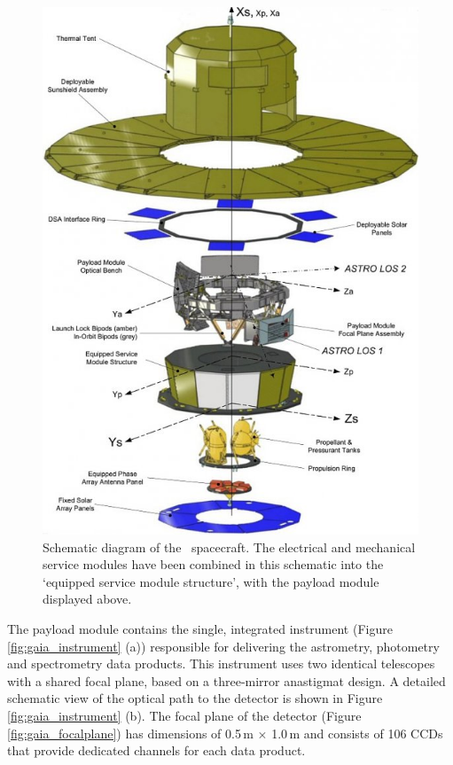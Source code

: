 \begin{figure}[h]
    \centering
    \includegraphics[width=0.6\linewidth]{Chapter4/gaia_schematic.jpg}
    \caption{Schematic diagram of the \Gaia~spacecraft. The electrical and mechanical service modules have been combined in this schematic into the `equipped service module structure', with the payload module displayed above.}
    \label{fig:Gaia_structure}
\end{figure}

The payload module contains the single, integrated instrument (Figure \ref{fig:gaia_instrument} (a)) responsible for delivering the astrometry, photometry and spectrometry data products. This instrument uses two identical telescopes with a shared focal plane, based on a three-mirror anastigmat design. A detailed schematic view of the optical path to the detector is shown in Figure \ref{fig:gaia_instrument} (b). The focal plane of the detector (Figure \ref{fig:gaia_focalplane}) has dimensions of 0.5\,m $\times$ 1.0\,m and consists of 106 CCDs that provide dedicated channels for each data product.

